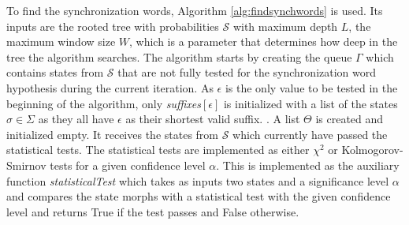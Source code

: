 {To find the synchronization words, Algorithm \ref{alg:findsynchwords} is used. Its inputs are the rooted tree with probabilities $\mathcal{S}$ with maximum depth $L$, the maximum window size $W$, which is a parameter that determines how deep in the tree the algorithm searches. The algorithm starts by creating the queue $\Gamma$ which contains states from $\mathcal{S}$ that are not fully tested for the synchronization word hypothesis during the current iteration. As $\epsilon$ is the only value to be tested in the beginning of the algorithm, only \textit{suffixes}$[\epsilon]$ is initialized with a list of the states  $\sigma \in \Sigma$ as they all have $\epsilon$ as their shortest valid suffix. . A list $\Theta$ is created and initialized empty. It receives the states from $\mathcal{S}$ which currently have passed the statistical tests. The statistical tests are implemented as either $\chi^2$ or Kolmogorov-Smirnov tests for a given confidence level $\alpha$. This is implemented as the auxiliary function \textit{statisticalTest} which takes as inputs two states and a significance level $\alpha$ and compares the state morphs with a statistical test with the given confidence level and returns True if the test passes and False otherwise.



 
 
 
 
 
}
